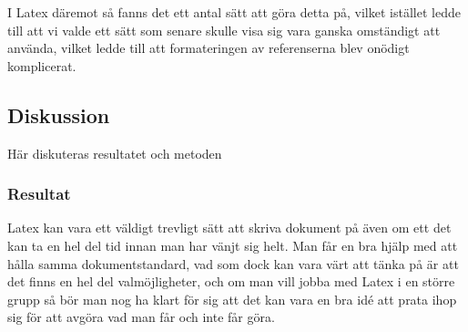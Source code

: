I Latex däremot så fanns det ett antal sätt att göra detta på, vilket istället ledde till att vi valde ett sätt som senare skulle visa sig vara ganska omständigt att använda, vilket ledde till att formateringen av referenserna blev onödigt komplicerat.

\subsection{Diskussion}
Här diskuteras resultatet och metoden





\subsubsection{Resultat}
Latex kan vara ett väldigt trevligt sätt att skriva dokument på även om ett det kan ta en hel del tid innan man har vänjt sig helt. Man får en bra hjälp med att hålla samma dokumentstandard, vad som dock kan vara värt att tänka på är att det finns en hel del valmöjligheter, och om man vill jobba med Latex i en större grupp så bör man nog ha klart för sig att det kan vara en bra idé att prata ihop sig för att avgöra vad man får och inte får göra.


